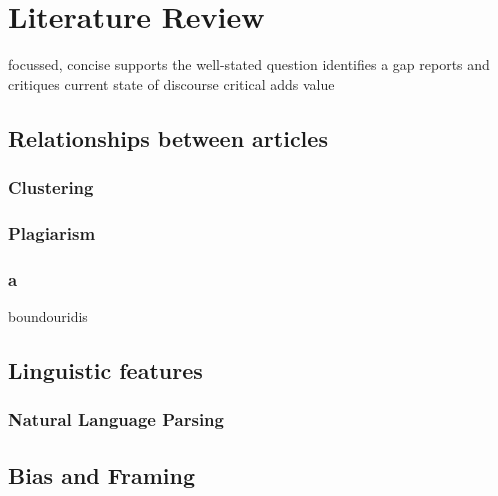 \chapter{Literature Review}

focussed, concise
supports the well-stated question
identifies a gap
reports and critiques current state of discourse
critical
adds value


\section{Relationships between articles}

\subsection{Clustering}

\subsection{Plagiarism}

\subsection{a}

boundouridis

\section{Linguistic features}

\subsection{Natural Language Parsing}

\section{Bias and Framing}
